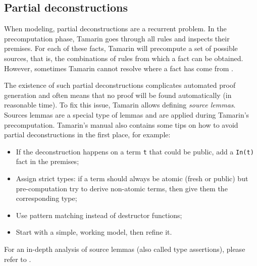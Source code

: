 \subsection{Partial deconstructions}

When modeling, partial deconstructions are a recurrent problem. In the precomputation phase, Tamarin goes through all rules and inspects their premises. For each of these facts, Tamarin will precompute a set of possible sources, that is, the combinations of rules from which a fact can be obtained. However, sometimes Tamarin cannot resolve where a fact has come from \cite{TamarinProverManual}.

The existence of such partial deconstructions complicates automated proof generation and often means that no proof will be found automatically (in reasonable time). To fix this issue, Tamarin allows defining \textit{source lemmas}. Sources lemmas are a special type of lemmas and are applied during Tamarin's precomputation. Tamarin's manual also contains some tips on how to avoid partial deconstructions in the first place, for example:

\begin{itemize}
  \item If the deconstruction happens on a term \lstinline{t} that could be public, add a \lstinline{In(t)} fact in the premises;
  \item Assign strict types: if a term should always be atomic (fresh or public) but pre-computation try to derive non-atomic terms, then give them the corresponding type;
  \item Use pattern matching instead of destructor functions;
  \item Start with a simple, working model, then refine it.
\end{itemize}

For an in-depth analysis of source lemmas (also called type assertions), please refer to \cite{Meier2013AdvancingAS}.
